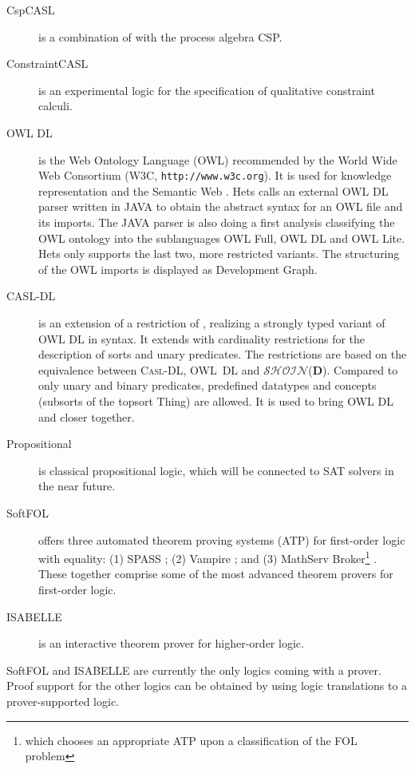 \documentclass{article}
\newcommand{\normalTEXTSC}[2]{{#1\scriptsize#2}}
\newcommand     {\Isabelle}{\normalTEXTSC{I}{SABELLE}\xspace}
\newcommand{\CASLDL}{\textmd{\textsc{Casl-DL}}\xspace}
\newcommand{\SHOIN}{$\mathcal{SHOIN}$(\textbf{D})\xspace}
\begin{document}
\begin{description}
\item[CspCASL] \cite{Roggenbach:2003:C-CN} is a combination of \CASL
  with the process algebra CSP.

\item[ConstraintCASL] is an experimental logic for the specification
of qualitative constraint calculi.

\item[OWL DL] is the Web Ontology Language (OWL) recommended by the
  World Wide Web Consortium (W3C, \texttt{http://www.w3c.org}). It is
  used for knowledge representation and the Semantic Web
  \cite{berners:2001:SWeb}. 
Hets calls an external OWL DL parser
  written in JAVA to obtain the abstract syntax for an OWL file and its
  imports. The JAVA parser is also doing a first analysis classifying
  the OWL ontology into the sublanguages OWL Full, OWL DL and OWL
  Lite. 
 Hets only supports the last two, more restricted variants. 
The
  structuring of the OWL imports is displayed as Development Graph.

\item[CASL-DL] \cite{OWL-CASL-WADT2004} 
is an extension of a restriction of \CASL, realizing
a strongly typed variant of OWL DL in \CASL syntax.
It extends
  \CASL with cardinality restrictions for the description of sorts and
  unary predicates. The restrictions are based on the equivalence
  between \CASLDL, OWL~DL and \SHOIN. Compared to \CASL only unary
  and binary predicates, predefined datatypes and concepts (subsorts
  of the topsort Thing) are allowed. It is used to bring OWL DL and
  \CASL closer together.

\item[Propositional] is classical propositional logic, which will
be connected to SAT solvers in the near future.

\item[SoftFOL] \cite{LuettichEA06a} offers three automated theorem
  proving systems (ATP) for first-order logic with equality: (1) SPASS
  \cite{WeidenbachEtAl02}; (2) Vampire \cite{RiazanovV02}; and (3)
  MathServ Broker\footnote{which chooses an appropriate ATP upon a
    classification of the FOL problem} \cite{ZimmerAutexier06}.
  These together comprise some of the most advanced theorem provers
  for first-order logic.

\item[\Isabelle] \cite{NipPauWen02} is an interactive theorem prover for higher-order
logic.
\end{description}
SoftFOL and \Isabelle are currently the only logics coming with a
prover. Proof support for the other logics can be obtained by using
logic translations to a prover-supported logic.
\end{document}
